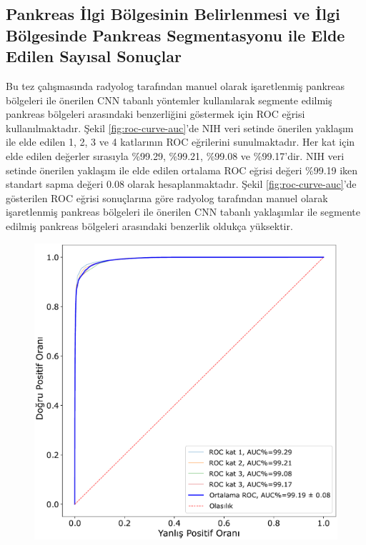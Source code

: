 \subsection{Pankreas İlgi Bölgesinin Belirlenmesi ve İlgi Bölgesinde Pankreas Segmentasyonu ile Elde Edilen Sayısal Sonuçlar}

Bu tez çalışmasında radyolog tarafından manuel olarak işaretlenmiş pankreas bölgeleri ile önerilen CNN tabanlı yöntemler kullanılarak segmente edilmiş pankreas bölgeleri arasındaki benzerliğini göstermek için ROC eğrisi kullanılmaktadır. Şekil \ref{fig:roc-curve-auc}’de NIH veri setinde önerilen yaklaşım ile elde edilen 1, 2, 3 ve 4 katlarının ROC eğrilerini sunulmaktadır. Her kat için elde edilen değerler sırasıyla \%99.29, \%99.21, \%99.08 ve \%99.17’dir. NIH veri setinde önerilen yaklaşım ile elde edilen ortalama ROC eğrisi değeri \%99.19 iken standart sapma değeri 0.08 olarak hesaplanmaktadır. Şekil \ref{fig:roc-curve-auc}’de gösterilen ROC eğrisi sonuçlarına göre radyolog tarafından manuel olarak işaretlenmiş pankreas bölgeleri ile önerilen CNN tabanlı yaklaşımlar ile segmente edilmiş pankreas bölgeleri arasındaki benzerlik oldukça yüksektir.

\begin{figure}[h!]
	\begin{center}
		\vspace{0.4cm}
		{
			\vspace{0.4cm}
			\includegraphics[scale=0.45]{Bulgular-Irdeleme/Figures/roc-curve-auc.pdf}
		}
	\end{center}
\end{figure}

